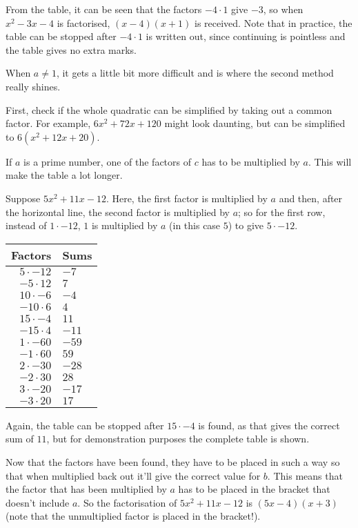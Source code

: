 From the table, it can be seen that the factors $-4 \cdot 1$ give $-3$, so when $x^2-3x-4$ is factorised, $(x-4)(x+1)$ is received. Note that in practice, the table can be stopped after $-4 \cdot 1$ is written out, since continuing is pointless and the table gives no extra marks.

When $a \neq 1$, it gets a little bit more difficult and is where the second method really shines.

First, check if the whole quadratic can be simplified by taking out a common factor. For example, $6x^2+72x+120$ might look daunting, but can be simplified to $6(x^2+12x+20)$.

If $a$ is a prime number, one of the factors of $c$ has to be multiplied by $a$. This will make the table a lot longer.

Suppose $5x^2+11x-12$. Here, the first factor is multiplied by $a$ and then, after the horizontal line, the second factor is multiplied by $a$; so for the first row, instead of $1 \cdot -12$, $1$ is multiplied by $a$ (in this case $5$) to give $5 \cdot -12$.

\medskip

\begin{tabular}{r | l}
	Factors & Sums\\
	\hline
	$5 \cdot -12$ & $-7$\\
	$-5 \cdot 12$ & $7$\\
	$10 \cdot -6$ & $-4$\\
	$-10 \cdot 6$ & $4$\\
	$15 \cdot -4$ & $11$\\
	$-15 \cdot 4$ & $-11$\\
	\hline
	$1 \cdot -60$ & $-59$\\
	$-1 \cdot 60$ & $59$\\
	$2 \cdot -30$ & $-28$\\
	$-2 \cdot 30$ & $28$\\
	$3 \cdot -20$ & $-17$\\
	$-3 \cdot 20$ & $17$\\
\end{tabular}

Again, the table can be stopped after $15 \cdot -4$ is found, as that gives the correct sum of $11$, but for demonstration purposes the complete table is shown.

Now that the factors have been found, they have to be placed in such a way so that when multiplied back out it'll give the correct value for $b$. This means that the factor that has been multiplied by $a$ has to be placed in the bracket that doesn't include $a$. So the factorisation of $5x^2+11x-12$ is $(5x-4)(x+3)$ (note that the unmultiplied factor is placed in the bracket!).

